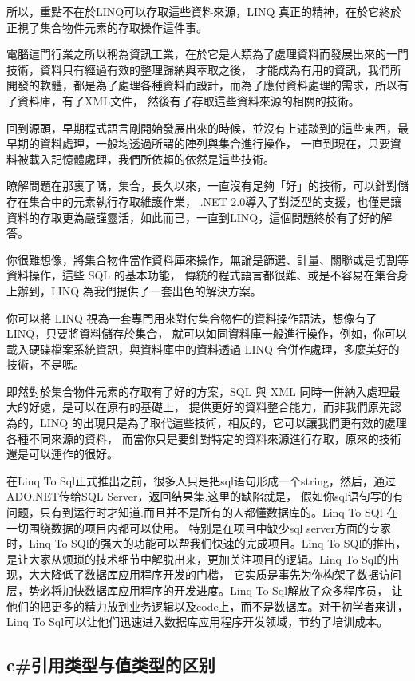 \documentclass{book}
\begin{document}
所以，重點不在於LINQ可以存取這些資料來源，LINQ 真正的精神，在於它終於正視了集合物件元素的存取操作這件事。

電腦這門行業之所以稱為資訊工業，在於它是人類為了處理資料而發展出來的一門技術，資料只有經過有效的整理歸納與萃取之後，
才能成為有用的資訊，我們所開發的軟體，都是為了處理各種資料而設計，而為了應付資料處理的需求，所以有了資料庫，有了XML文件，
然後有了存取這些資料來源的相關的技術。

回到源頭，早期程式語言剛開始發展出來的時候，並沒有上述談到的這些東西，最早期的資料處理，一般均透過所謂的陣列與集合進行操作，
一直到現在，只要資料被載入記憶體處理，我們所依賴的依然是這些技術。

瞭解問題在那裏了嗎，集合，長久以來，一直沒有足夠「好」的技術，可以針對儲存在集合中的元素執行存取維護作業，
.NET 2.0導入了對泛型的支援，也僅是讓資料的存取更為嚴謹靈活，如此而已，一直到LINQ，這個問題終於有了好的解答。

你很難想像，將集合物件當作資料庫來操作，無論是篩選、計量、關聯或是切割等資料操作，這些 SQL 的基本功能，
傳統的程式語言都很難、或是不容易在集合身上辦到，LINQ 為我們提供了一套出色的解決方案。

你可以將 LINQ 視為一套專門用來對付集合物件的資料操作語法，想像有了LINQ，只要將資料儲存於集合，
就可以如同資料庫一般進行操作，例如，你可以載入硬碟檔案系統資訊，與資料庫中的資料透過 LINQ 合併作處理，多麼美好的技術，不是嗎。

即然對於集合物件元素的存取有了好的方案，SQL 與 XML 同時一併納入處理最大的好處，是可以在原有的基礎上，
提供更好的資料整合能力，而非我們原先認為的，LINQ 的出現只是為了取代這些技術，相反的，它可以讓我們更有效的處理各種不同來源的資料，
而當你只是要針對特定的資料來源進行存取，原來的技術還是可以運作的很好。

在Linq To Sql正式推出之前，很多人只是把sql语句形成一个string，然后，通过ADO.NET传给SQL Server，返回结果集.这里的缺陷就是，
假如你sql语句写的有问题，只有到运行时才知道.而且并不是所有的人都懂数据库的。Linq To SQl 在一切围绕数据的项目内都可以使用。
特别是在项目中缺少sql server方面的专家时，Linq To SQl的强大的功能可以帮我们快速的完成项目。Linq To SQl的推出，
是让大家从烦琐的技术细节中解脱出来，更加关注项目的逻辑。Linq To Sql的出现，大大降低了数据库应用程序开发的门楷，
它实质是事先为你构架了数据访问层，势必将加快数据库应用程序的开发进度。Linq To Sql解放了众多程序员，
让他们的把更多的精力放到业务逻辑以及code上，而不是数据库。对于初学者来讲，Linq To Sql可以让他们迅速进入数据库应用程序开发领域，节约了培训成本。

\subsection{c\#引用类型与值类型的区别}
\end{document}
